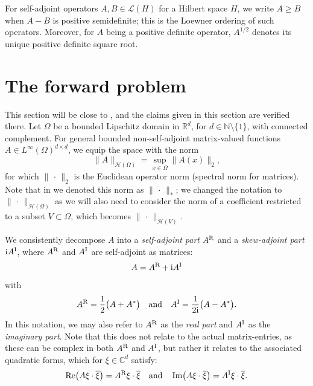 \documentclass[reqno]{amsart}
\numberwithin{equation}{section}
\numberwithin{figure}{section}
\numberwithin{table}{section}
\theoremstyle{plain}
\theoremstyle{definition}
\theoremstyle{remark}
\newcommand{\norm}[1]{\lVert#1\rVert}
\newcommand{\redel}{\mathop{\textup{Re}}}
\newcommand{\imdel}{\mathop{\textup{Im}}}
\newcommand{\R}{\mathbb{R}}
\newcommand{\N}{\mathbb{N}}
\newcommand{\C}{\mathbb{C}}
\newcommand{\I}{\mathrm{i}}    %
\newcommand{\upR}{^{\textup{R}}}
\newcommand{\upI}{^{\textup{I}}}
\newcommand{\AR}{A\upR}
\newcommand{\AI}{A\upI}
\begin{document}
	For self-adjoint operators $A,B\in\mathscr{L}(H)$ for a Hilbert space $H$, we write $A\geq B$ when $A-B$ is positive semidefinite; this is the Loewner ordering of such operators. Moreover, for $A$ being a positive definite operator, $A^{1/2}$ denotes its unique positive definite square root.
	
	\section{The forward problem} \label{sec:forward}
	
	This section will be close to \cite[section 2]{GJZ2025}, and the claims given in this section are verified there. Let $\Omega$ be a bounded Lipschitz domain in $\R^d$, for $d\in\N\setminus\{1\}$, with connected complement. For general bounded non-self-adjoint matrix-valued functions $A\in L^\infty(\Omega)^{d\times d}$, we equip the space with the norm
	\begin{equation*}
		\norm{A}_{\mathcal{H}(\Omega)} = \sup_{x\in\Omega}\norm{A(x)}_2,
	\end{equation*}
	for which $\norm{\,\cdot\,}_2$ is the Euclidean operator norm (spectral norm for matrices). Note that in \cite{GJZ2025} we denoted this norm as $\norm{\,\cdot\,}_*$; we changed the notation to $\norm{\,\cdot\,}_{\mathcal{H}(\Omega)}$ as we will also need to consider the norm of a coefficient restricted to a subset $V\subset\Omega$, which becomes $\norm{\,\cdot\,}_{\mathcal{H}(V)}$.
	
	We consistently decompose $A$ into a \emph{self-adjoint part} $\AR$ and a \emph{skew-adjoint part} $\I\AI$, where $\AR$ and $\AI$ are self-adjoint as matrices:
	\begin{equation*}
		A = \AR + \I\AI
	\end{equation*}
	with
	\begin{equation*}
		\AR = \frac{1}{2}\bigl(A + A^*\bigr) \quad \text{and} \quad \AI = \frac{1}{2\I}\bigl(A - A^*\bigr).
	\end{equation*}
	In this notation, we may also refer to $\AR$ as the \emph{real part} and $\AI$ as the \emph{imaginary part}. Note that this does not relate to the actual matrix-entries, as these can be complex in both $\AR$ and $\AI$, but rather it relates to the associated quadratic forms, which for $\xi\in\C^d$ satisfy:
	\begin{equation*}
		\redel \bigl(A\xi\cdot\overline{\xi}\bigr) = \AR\xi\cdot\overline{\xi} \quad \text{and} \quad \imdel \bigl(A\xi\cdot\overline{\xi}\bigr) = \AI\xi\cdot\overline{\xi}.
	\end{equation*}
	
\end{document}
